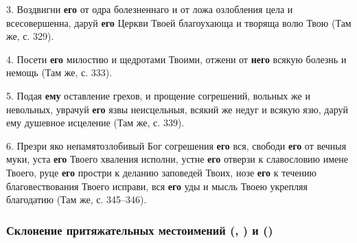 \documentclass[11pt,a4paper,oneside]{memoir}
\begin{document}
    3. Воздвигни \textbf{его} от одра болезненнаго и от ложа озлобления цела и всесовершенна, даруй \textbf{его} Церкви Твоей благоухающа и творяща волю Твою (Там же, с. 329).
    
    4. Посети \textbf{его} милостию и щедротами Твоими, отжени от \textbf{него} всякую болезнь и немощь (Там же, с. 333).
    
    5. Подая \textbf{ему} оставление грехов, и прощение согрешений, вольных же и невольных, уврачуй \textbf{его} язвы неисцельныя, всякий же недуг и всякую язю, даруй ему душевное исцеление (Там же, с. 339).
    
    6. Презри яко непамятозлобивый Бог согрешения \textbf{его} вся, свободи \textbf{его} от вечныя муки, уста \textbf{его} Твоего хваления исполни, устне \textbf{его} отверзи к славословию имене Твоего, руце \textbf{его} простри к деланию заповедей Твоих, нозе \textbf{его} к течению благовествования Твоего исправи, вся \textbf{его} уды и мысль Твоею укрепляя благодатию (Там же, с. 345--346).

                \subsubsection[Склонение притяжательных местоимений]{Склонение притяжательных местоимений {} ({}, {}) и {} ({})}
    
\end{document}
